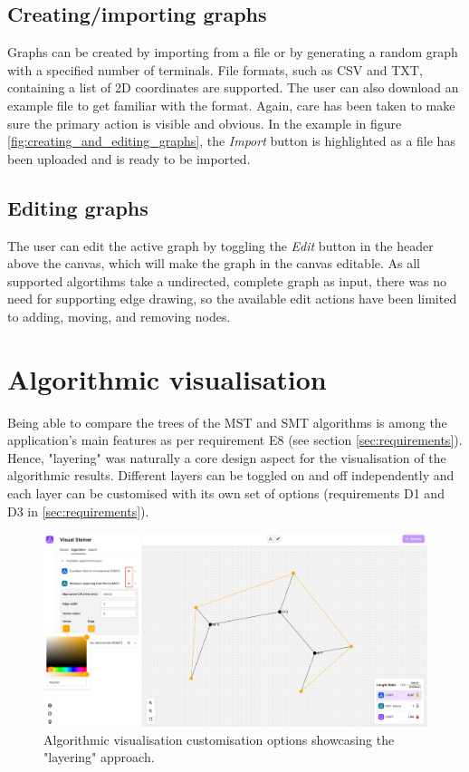 \documentclass{l4proj}
\begin{document}
\subsection{Creating/importing graphs}
Graphs can be created by importing from a file or by generating a random graph with a specified number of terminals.
File formats, such as CSV and TXT, containing a list of 2D coordinates are supported. The user can also download an example file to get familiar with the format.
Again, care has been taken to make sure the primary action is visible and obvious. In the example in figure \ref{fig:creating_and_editing_graphs}, the \textit{Import} button is highlighted as a file has been uploaded and is ready to be imported.

\subsection{Editing graphs}
The user can edit the active graph by toggling the \textit{Edit} button in the header above the canvas, which will make the graph in the canvas editable. As all supported algortihms take a undirected, complete graph as input, there was no need for supporting edge drawing, so the available edit actions have been limited to adding, moving, and removing nodes.

\section{Algorithmic visualisation}
Being able to compare the trees of the MST and SMT algorithms is among the application's main features as per requirement E8 (see section \ref{sec:requirements}). Hence, "layering" was naturally a core design aspect for the visualisation of the algorithmic results. Different layers can be toggled on and off independently and each layer can be customised with its own set of options (requirements D1 and D3 in \ref{sec:requirements}).
\begin{figure}[hp]
    \centering
    \begin{tcolorbox}[colframe=gray!20, colback=gray!5, boxrule=1pt, arc=0mm, boxsep=0pt, left=0pt, right=0pt, top=0pt, bottom=0pt]
        \includegraphics[width=\textwidth]{images/algorithm_visualisation.png}
    \end{tcolorbox}

    \caption{Algorithmic visualisation customisation options showcasing the "layering" approach.}
    \label{fig:algorithm_visualisation}
\end{figure}
\end{document}
